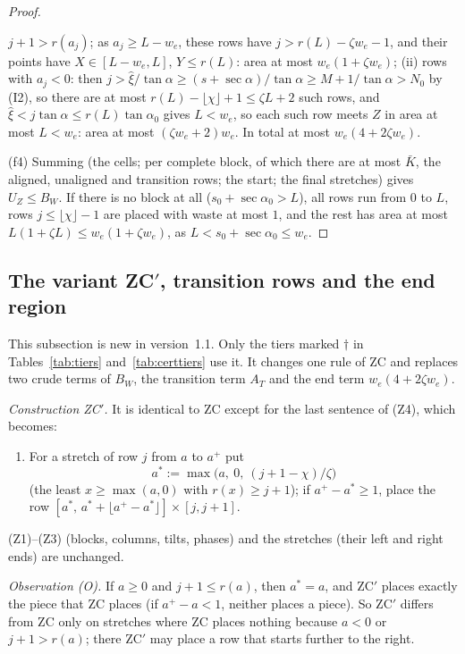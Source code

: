 \documentclass[11pt]{amsart}
\newcommand{\ta}{\tan\alpha}
\newcommand{\se}{\sec\alpha}
\newcommand{\taz}{\tan\alpha_0}
\newcommand{\sez}{\sec\alpha_0}
\newcommand{\Kb}{\bar K}
\theoremstyle{definition}
\theoremstyle{remark}
\numberwithin{equation}{section}
\begin{document}
\begin{proof}
\begin{itemize}
$j+1>r(a_j)$; as $a_j\ge L-w_e$, these rows have $j>r(L)-\zeta w_e-1$, and their points have $X\in[L-w_e,L]$,
$Y\le r(L)$: area at most $w_e(1+\zeta w_e)$; (ii) rows with $a_j<0$: then $j>\hat\xi/\ta\ge(s+\se)/\ta\ge M+1/\ta>N_0$
by (I2), so there are at most $r(L)-\lfloor\chi\rfloor+1\le\zeta L+2$ such rows, and $\hat\xi<j\ta\le r(L)\taz$ gives
$L<w_e$, so each such row meets $Z$ in area at most $L<w_e$: area at most $(\zeta w_e+2)w_e$. In total at most
$w_e(4+2\zeta w_e)$.
\end{itemize}
(f4) Summing (the cells; per complete block, of which there are at most $\Kb$, the aligned, unaligned and transition
rows; the start; the final stretches) gives $U_Z\le B_W$. If there is no block at all ($s_0+\sez>L$), all rows run from
$0$ to $L$, rows $j\le\lfloor\chi\rfloor-1$ are placed with waste at most $1$, and the rest has area at most
$L(1+\zeta L)\le w_e(1+\zeta w_e)$, as $L<s_0+\sez\le w_e$.
\end{proof}

\subsection{The variant ZC\texorpdfstring{$'$}{'}, transition rows and the end region}\label{ssec:refine}
This subsection is new in version~1.1. Only the tiers marked $\dagger$ in Tables~\ref{tab:tiers}
and~\ref{tab:certtiers} use it. It changes one rule of ZC and replaces two crude terms of $B_W$, the transition term
$A_T$ and the end term $w_e(4+2\zeta w_e)$.

\emph{Construction ZC$'$.} It is identical to ZC except for the last sentence of (Z4), which becomes:
\begin{enumerate}[label=(Z4$'$)]
\item For a stretch of row $j$ from $a$ to $a^+$ put
\[
a^*:=\max\bigl(a,\ 0,\ (j+1-\chi)/\zeta\bigr)
\]
(the least $x\ge\max(a,0)$ with $r(x)\ge j+1$); if $a^+-a^*\ge1$, place the row $[a^*,\,a^*+\lfloor a^+-a^*\rfloor]\times[j,j+1]$.
\end{enumerate}
(Z1)--(Z3) (blocks, columns, tilts, phases) and the stretches (their left and right ends) are unchanged.

\emph{Observation (O).} If $a\ge0$ and $j+1\le r(a)$, then $a^*=a$, and ZC$'$ places exactly the piece that ZC places
(if $a^+-a<1$, neither places a piece). So ZC$'$ differs from ZC only on stretches where ZC places nothing because $a<0$
or $j+1>r(a)$; there ZC$'$ may place a row that starts further to the right.
\end{document}
